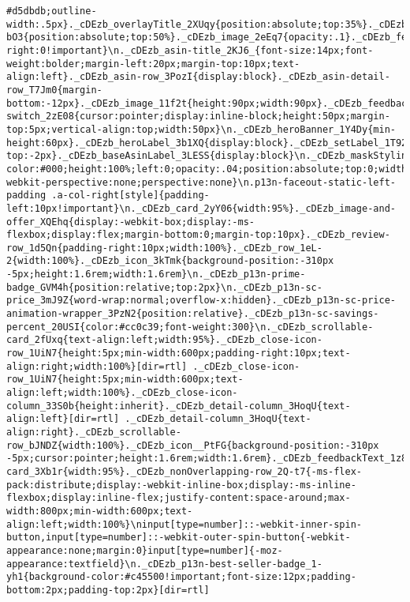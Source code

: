 \documentclass[
]{article}
\begin{document}
\begin{verbatim}
#d5dbdb;outline-width:.5px}._cDEzb_overlayTitle_2XUqy{position:absolute;top:35%}._cDEzb_notInterestedMessage_2-bO3{position:absolute;top:50%}._cDEzb_image_2eEq7{opacity:.1}._cDEzb_feedbackRow_17KjU{margin-right:0!important}\n._cDEzb_asin-title_2KJ6_{font-size:14px;font-weight:bolder;margin-left:20px;margin-top:10px;text-align:left}._cDEzb_asin-row_3PozI{display:block}._cDEzb_asin-detail-row_T7Jm0{margin-bottom:-12px}._cDEzb_image_11f2t{height:90px;width:90px}._cDEzb_feedback-switch_2zE08{cursor:pointer;display:inline-block;height:50px;margin-top:5px;vertical-align:top;width:50px}\n._cDEzb_heroBanner_1Y4Dy{min-height:60px}._cDEzb_heroLabel_3b1XQ{display:block}._cDEzb_setLabel_1T92X{display:block;margin-top:-2px}._cDEzb_baseAsinLabel_3LESS{display:block}\n._cDEzb_maskStyling_1IlBq{background-color:#000;height:100%;left:0;opacity:.04;position:absolute;top:0;width:100%}._cDEzb_positionRelativeCss_ZwMqj{padding:6px;position:relative}._cDEzb_noop_3Xbw5{-webkit-perspective:none;perspective:none}\n.p13n-faceout-static-left-padding .a-col-right[style]{padding-left:10px!important}\n._cDEzb_card_2yY06{width:95%}._cDEzb_image-and-offer_XQEhq{display:-webkit-box;display:-ms-flexbox;display:flex;margin-bottom:0;margin-top:10px}._cDEzb_review-row_1d5Qn{padding-right:10px;width:100%}._cDEzb_row_1eL-2{width:100%}._cDEzb_icon_3kTmk{background-position:-310px -5px;height:1.6rem;width:1.6rem}\n._cDEzb_p13n-prime-badge_GVM4h{position:relative;top:2px}\n._cDEzb_p13n-sc-price_3mJ9Z{word-wrap:normal;overflow-x:hidden}._cDEzb_p13n-sc-price-animation-wrapper_3PzN2{position:relative}._cDEzb_p13n-sc-savings-percent_20USI{color:#cc0c39;font-weight:300}\n._cDEzb_scrollable-card_2fUxq{text-align:left;width:95%}._cDEzb_close-icon-row_1UiN7{height:5px;min-width:600px;padding-right:10px;text-align:right;width:100%}[dir=rtl] ._cDEzb_close-icon-row_1UiN7{height:5px;min-width:600px;text-align:left;width:100%}._cDEzb_close-icon-column_33S0b{height:inherit}._cDEzb_detail-column_3HoqU{text-align:left}[dir=rtl] ._cDEzb_detail-column_3HoqU{text-align:right}._cDEzb_scrollable-row_bJNDZ{width:100%}._cDEzb_icon__PtFG{background-position:-310px -5px;cursor:pointer;height:1.6rem;width:1.6rem}._cDEzb_feedbackText_1z8PE{cursor:pointer}._cDEzb_nonOverlapping-card_3Xb1r{width:95%}._cDEzb_nonOverlapping-row_2Q-t7{-ms-flex-pack:distribute;display:-webkit-inline-box;display:-ms-inline-flexbox;display:inline-flex;justify-content:space-around;max-width:800px;min-width:600px;text-align:left;width:100%}\ninput[type=number]::-webkit-inner-spin-button,input[type=number]::-webkit-outer-spin-button{-webkit-appearance:none;margin:0}input[type=number]{-moz-appearance:textfield}\n._cDEzb_p13n-best-seller-badge_1-yh1{background-color:#c45500!important;font-size:12px;padding-bottom:2px;padding-top:2px}[dir=rtl] 
\end{verbatim}
\end{document}
